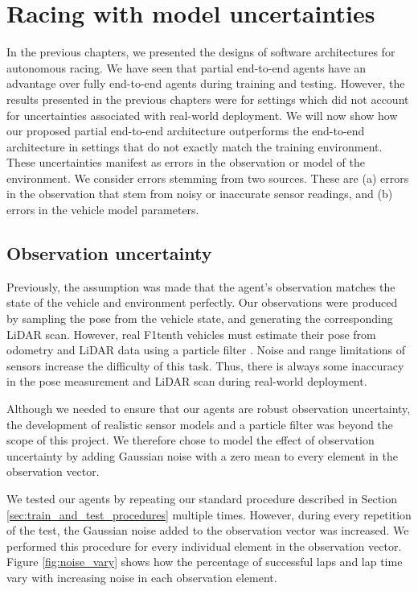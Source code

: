 \chapter{Racing with model uncertainties}
\label{chp:racing}

In the previous chapters, we presented the designs of software architectures for autonomous racing.
We have seen that partial end-to-end agents have an advantage over fully end-to-end agents during training and testing.
However, the results presented in the previous chapters were for settings which did not account for uncertainties associated with real-world deployment.
We will now show how our proposed partial end-to-end architecture outperforms the end-to-end architecture in settings that do not exactly match the training environment.
These uncertainties manifest as errors in the observation or model of the environment.
We consider errors stemming from two sources.
These are  (a) errors in the observation that stem from noisy or inaccurate sensor readings, and (b) errors in the vehicle model parameters.


\section{Observation uncertainty}
Previously, the assumption was made that the agent's observation matches the state of the vehicle and environment perfectly.
Our observations were produced by sampling the pose from the vehicle state, and generating the corresponding LiDAR scan.
However, real F1tenth vehicles must estimate their pose from odometry and LiDAR data using a particle filter \cite{f1tenth}.
Noise and range limitations of sensors increase the difficulty of this task.
Thus, there is always some inaccuracy in the pose measurement and LiDAR scan during real-world deployment.

Although we needed to ensure that our agents are robust observation uncertainty, the development of realistic sensor models and a particle filter was beyond the scope of this project.
We therefore chose to model the effect of observation uncertainty by adding Gaussian noise with a zero mean to every element in the observation vector.

We tested our agents by repeating our standard procedure described in Section \ref{sec:train_and_test_procedures} multiple times. 
However, during every repetition of the test, the Gaussian noise added to the observation vector was increased.
We performed this procedure for every individual element in the observation vector.
Figure \ref{fig:noise_vary} shows how the percentage of successful laps and lap time vary with increasing noise in each observation element.

